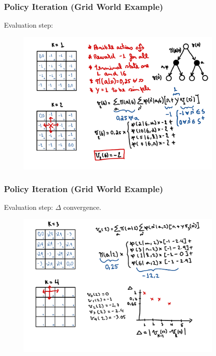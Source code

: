 \begin{frame}
    \frametitle{Policy Iteration (Grid World Example)}
    Evaluation step:

    \begin{figure}
        \centering
        \includegraphics[width=0.9\textwidth]{sections/optimization/figures/grid_world_pi_2.pdf}
    \end{figure}
\end{frame}





\begin{frame}
    \frametitle{Policy Iteration (Grid World Example)}
    Evaluation step: $\Delta$ convergence.
    \begin{figure}
        \centering
        \includegraphics[width=0.9\textwidth]{sections/optimization/figures/grid_world_pi_3.pdf}
    \end{figure}
\end{frame}

